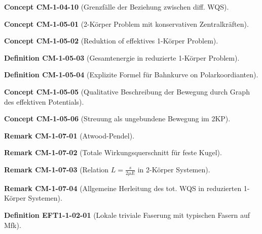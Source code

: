 \documentclass[10pt, letterpaper]{article}
\newcommand{\CustomHeading}[3]{%
  \par\medskip\noindent%
  \textbf{#1 #2} \textnormal{(#3)}.\enskip%
}
\newenvironment{DEF}[2]{\CustomHeading{Definition}{#1}{#2}}{}
\newenvironment{REM}[2]{\CustomHeading{Remark}{#1}{#2}}{}
\newenvironment{CONC}[2]{\CustomHeading{Concept}{#1}{#2}}{}
\begin{document}
\begin{CONC}{CM-1-04-10}{Grenzfälle der Beziehung zwischen diff. WQS}
\end{CONC}

\begin{CONC}{CM-1-05-01}{2-Körper Problem mit konservativen Zentralkräften}
\end{CONC}

\begin{CONC}{CM-1-05-02}{Reduktion of effektives 1-Körper Problem}
\end{CONC}

\begin{DEF}{CM-1-05-03}{Gesamtenergie in reduzierte 1-Körper Problem}
\end{DEF}

\begin{DEF}{CM-1-05-04}{Explizite Formel für Bahnkurve on Polarkoordianten}
\end{DEF}

\begin{CONC}{CM-1-05-05}{Qualitative Beschreibung der Bewegung durch Graph des effektiven Potentials}
\end{CONC}

\begin{CONC}{CM-1-05-06}{Streuung als ungebundene Bewegung im 2KP}
\end{CONC}

\begin{REM}{CM-1-07-01}{Atwood-Pendel}
\end{REM}

\begin{REM}{CM-1-07-02}{Totale Wirkungsquerschnitt für feste Kugel}
\end{REM}

\begin{REM}{CM-1-07-03}{Relation $L = \frac{s}{2\mu E}$ in 2-Körper Systemen}
\end{REM}

\begin{REM}{CM-1-07-04}{Allgemeine Herleitung des tot. WQS in reduzierten 1-Körper Systemen}
\end{REM}

\begin{DEF}{EFT1-1-02-01}{Lokale triviale Faserung mit typischen Fasern auf Mfk}
\end{DEF}
\end{document}
